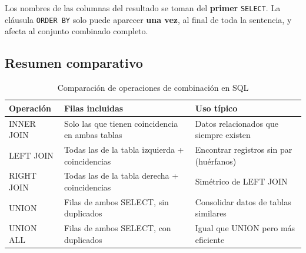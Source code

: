 \begin{nota}
  Los nombres de las columnas del resultado se toman del \textbf{primer} \texttt{SELECT}.
  La cláusula \texttt{ORDER BY} solo puede aparecer \textbf{una vez}, al final de toda la
  sentencia, y afecta al conjunto combinado completo.
\end{nota}

\subsection*{Resumen comparativo}

\begin{table}[H]
  \centering
  \caption{Comparación de operaciones de combinación en SQL}
  \renewcommand{\arraystretch}{1.3}
  \begin{tabularx}{\textwidth}{>{\ttfamily}l X X}
    \toprule
    \textbf{Operación}  & \textbf{Filas incluidas}                                   & \textbf{Uso típico}                         \\
    \midrule
    INNER JOIN  & Solo las que tienen coincidencia en ambas tablas             & Datos relacionados que siempre existen      \\
    LEFT JOIN   & Todas las de la tabla izquierda + coincidencias              & Encontrar registros sin par (huérfanos)     \\
    RIGHT JOIN  & Todas las de la tabla derecha + coincidencias                & Simétrico de LEFT JOIN                      \\
    UNION       & Filas de ambos SELECT, sin duplicados                        & Consolidar datos de tablas similares        \\
    UNION ALL   & Filas de ambos SELECT, con duplicados                        & Igual que UNION pero más eficiente          \\
    \bottomrule
  \end{tabularx}
\end{table}

